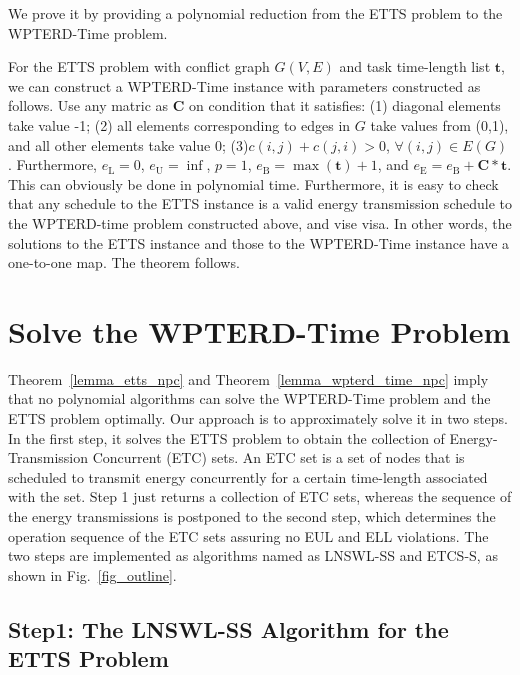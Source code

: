 \documentclass[12pt,journal,onecolumn,draftcls]{IEEEtran}
\begin{document}
\begin{IEEEproof}
We prove it by providing a polynomial reduction from the ETTS problem to the WPTERD-Time problem.

For the ETTS problem with conflict graph $G(V,E)$ and task time-length list $\mathbf{t}$, we can construct a WPTERD-Time instance with parameters constructed as follows. Use any matric as $\mathbf{C}$ on condition that it satisfies: (1) diagonal elements take value -1; (2) all elements corresponding to edges in $G$ take values from (0,1), and all other elements take value 0; (3)$c(i,j){+}c(j,i){>}0$, ${\forall}(i,j){\in}E(G)$. Furthermore, $e_\text{L}{=}0$, $e_\text{U}{=}\inf$, $p{=}1$, $e_\text{B}{=}\max(\mathbf{t}){+}1$, and $e_\text{E}{=}e_\text{B}{+}\mathbf{C}{*}\mathbf{t}$. This can obviously be done in polynomial time. Furthermore, it is easy to check that any schedule to the ETTS instance is a valid energy transmission schedule to the WPTERD-time problem constructed above, and vise visa. In other words, the solutions to the ETTS instance and those to the WPTERD-Time instance have a one-to-one map. The theorem follows.
\end{IEEEproof}

\section{Solve the WPTERD-Time Problem}
\label{sec_solve_wpter_time}

Theorem~\ref{lemma_etts_npc} and Theorem~\ref{lemma_wpterd_time_npc} imply that no polynomial algorithms can solve the WPTERD-Time problem and the ETTS problem optimally. Our approach is to approximately solve it in two steps. In the first step, it solves the ETTS problem to obtain the collection of Energy-Transmission Concurrent (ETC) sets. An ETC set is a set of nodes that is scheduled to transmit energy concurrently for a certain time-length associated with the set. Step 1 just returns a collection of ETC sets, whereas the sequence of the energy transmissions is postponed to the second step, which determines the operation sequence of the ETC sets assuring no EUL and ELL violations. The two steps are implemented as algorithms named as LNSWL-SS and ETCS-S, as shown in Fig.~\ref{fig_outline}.

\subsection{Step1: The LNSWL-SS Algorithm for the ETTS Problem}
\end{document}
